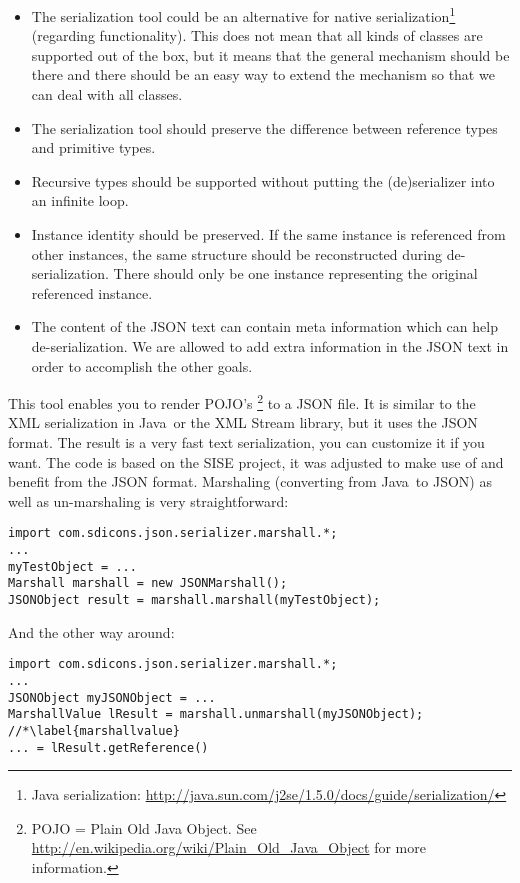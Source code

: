 \documentclass[a4paper]{article}
\newcommand{\java}{Java}
\begin{document}
\begin{itemize}
	\item The serialization tool could be an alternative for native serialization\footnote{Java serialization: \url{http://java.sun.com/j2se/1.5.0/docs/guide/serialization/}} (regarding functionality). This does not mean that all kinds of classes are supported out of the box, but it means that the general mechanism should be there and there should be an easy way to extend the mechanism so that we can deal with all classes.
	\item The serialization tool should preserve the difference between reference types and primitive types.
	\item Recursive types should be supported without putting the (de)serializer into an infinite loop.
	\item Instance identity should be preserved. If the same instance is referenced from other instances, the same structure should be reconstructed during de-serialization. There should only be one instance representing the original referenced instance.
	\item The content of the JSON text can contain meta information which can help de-serialization. We are allowed to add extra information in the JSON text in order to accomplish the other goals.
\end{itemize}

This tool enables you to render POJO's \footnote{POJO = Plain Old Java Object. See \url{http://en.wikipedia.org/wiki/Plain_Old_Java_Object} for more information.}  to a JSON file. It is similar to the XML serialization in \java\ or the XML Stream library, but it uses the JSON format. The result is a very fast text serialization, you can customize it if you want.  The code is based on the SISE project, it was adjusted to make use of and benefit from the JSON format. Marshaling (converting from \java\ to JSON) as well as un-marshaling is very straightforward:

\medskip
\begin{lstlisting}
import com.sdicons.json.serializer.marshall.*;
...
myTestObject = ...
Marshall marshall = new JSONMarshall();
JSONObject result = marshall.marshall(myTestObject);
\end{lstlisting}
\medskip

And the other way around:
 
\medskip
\begin{lstlisting}
import com.sdicons.json.serializer.marshall.*;
...
JSONObject myJSONObject = ...
MarshallValue lResult = marshall.unmarshall(myJSONObject); //*\label{marshallvalue}
... = lResult.getReference()
\end{lstlisting}
\medskip
\end{document}

